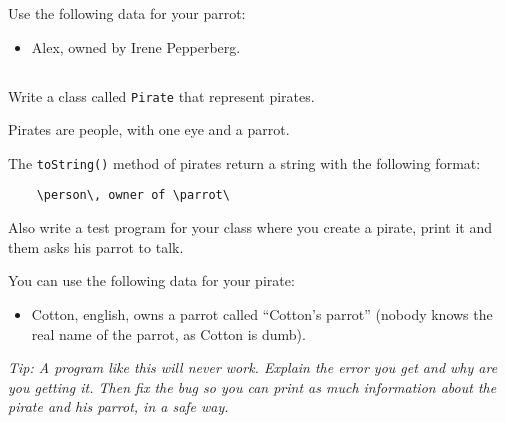 \documentclass[a4paper, 11pt]{article}
\begin{document}
Use the following data for your parrot:

\begin{itemize}

  \item Alex, owned by Irene Pepperberg.

\end{itemize}










\subsection{}

Write a class called \verb+Pirate+ that represent pirates.

Pirates are people, with one eye and a parrot.

The \verb+toString()+ method of pirates return a string with the following
format:

\verb+    \person\, owner of \parrot\+

Also write a test program for your class where you create a pirate, print it
and them asks his parrot to talk.

You can use the following data for your pirate:

\begin{itemize}

  \item Cotton, english, owns a parrot called ``Cotton's parrot'' (nobody knows the real name of the parrot, as Cotton is dumb).

\end{itemize}

\textsl{Tip: A program like this will never work. Explain the error you get and
why are you getting it.  Then fix the bug so you can print as much information
about the pirate and his parrot, in a safe way.}

\end{document}
